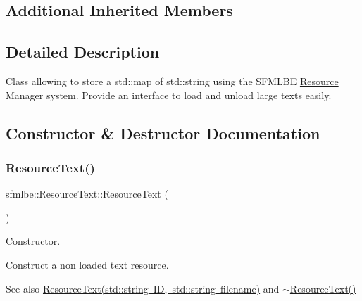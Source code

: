 \subsection*{Additional Inherited Members}


\subsection{Detailed Description}
Class allowing to store a std\+::map of std\+::string using the S\+F\+M\+L\+BE \mbox{\hyperlink{classsfmlbe_1_1_resource}{Resource}} Manager system. Provide an interface to load and unload large texts easily. 

\subsection{Constructor \& Destructor Documentation}
\mbox{\label{classsfmlbe_1_1_resource_text_aaf976bc4d8e514a621239ab3ef61b294}} 
\subsubsection{\texorpdfstring{Resource\+Text()}{ResourceText()}\hspace{0.1cm}{\footnotesize\ttfamily [1/2]}}
{\footnotesize\ttfamily sfmlbe\+::\+Resource\+Text\+::\+Resource\+Text (\begin{DoxyParamCaption}{ }\end{DoxyParamCaption})}



Constructor. 

Construct a non loaded text resource. \begin{DoxySeeAlso}{See also}
\mbox{\hyperlink{classsfmlbe_1_1_resource_text_a05e07dcbb416cee62e4060627a76c749}{Resource\+Text(std\+::string I\+D, std\+::string filename)}} and \mbox{\hyperlink{classsfmlbe_1_1_resource_text_a037b1bd5ac566301358ee5cd75a4cd00}{$\sim$\+Resource\+Text()}} 
\end{DoxySeeAlso}
\mbox{\label{classsfmlbe_1_1_resource_text_a05e07dcbb416cee62e4060627a76c749}} 
